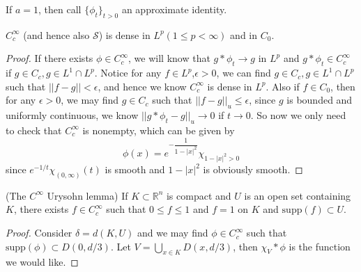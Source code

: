 \documentclass[lang=en, color=blue, ]{elegantbook}
\newcommand{\R}{\mathbb{R}}
\newcommand{\Sch}{\mathcal{S}}
\begin{document}
\begin{definition}
    If $a=1$, then call $\{\phi_t\}_{t>0}$ an approximate identity.
\end{definition}

\begin{proposition}
    $C_c^{\infty}$ (and hence also $\Sch$) is dense in $L^p(1\leq p <\infty)$ and in $C_0$.
\end{proposition}
\begin{proof}\par
    If there exists $\phi\in C_c^{\infty}$, we will know that $g*\phi_t \to g$ in $L^p$ and $g*\phi_t \in C_c^{\infty}$ if $g\in C_c, g\in L^1\cap L^p$. Notice for any $f\in L^p$,$\epsilon > 0$, we can find $g\in C_c, g\in L^1\cap L^p$ such that $||f-g||<\epsilon$, and hence we know $C_c^{\infty}$ is dense in $L^p$. Also if $f\in C_0$, then for any $\epsilon > 0$, we may find $g\in C_c$ such that $||f-g||_u \leq \epsilon$, since $g$ is bounded and uniformly continuous, we know $||g*\phi_t - g||_u \to 0$ if $t\to 0$.
    So now we only need to check that $C_c^{\infty}$ is nonempty, which can be given by
    \[
    \phi(x) = e^{-\dfrac{1}{1-|x|^2}}\chi_{1-|x|^2 > 0}\]
    since $e^{-1/t}\chi_{(0,\infty)}(t)$ is smooth and $1-|x|^2$ is obviously smooth.
\end{proof}

\begin{theorem}
    (The $C^{\infty}$ Urysohn lemma) If $K\subset\R^n$ is compact and $U$ is an open set containing $K$, there exists $f\in C_c^{\infty}$ such that $0\leq f \leq 1$ and $f = 1$ on $K$ and $\text{supp}(f)\subset U$. 
\end{theorem}
\begin{proof}\par
    Consider $\delta = d(K,U)$ and we may find $\phi\in C_c^{\infty}$ such that $\text{supp}(\phi) \subset D(0,d/3)$. Let $V = \bigcup_{x\in K}D(x,d/3)$, then $\chi_V*\phi$ is the function we would like.
\end{proof}
\end{document}
